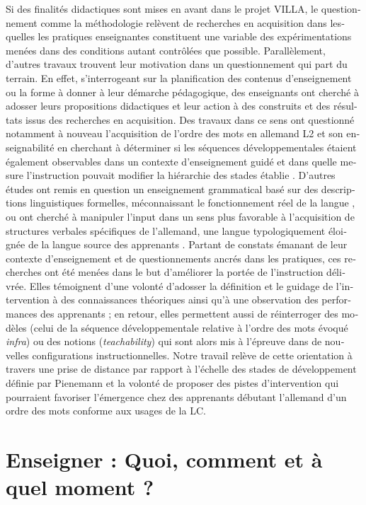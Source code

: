 \documentclass[output=paper]{langscibook}
\begin{document}
\begin{otherlanguage}{french}
Si des finalités didactiques sont mises en avant dans le projet VILLA, le questionnement comme la méthodologie relèvent de recherches en acquisition dans lesquelles les pratiques enseignantes constituent une variable des expérimentations menées dans des conditions autant contrôlées que possible. Parallèlement, d’autres travaux trouvent leur motivation dans un questionnement qui part du terrain. En effet, s’interrogeant sur la planification des contenus d’enseignement ou la forme à donner à leur démarche pédagogique, des enseignants ont cherché à adosser leurs propositions didactiques et leur action à des construits et des résultats issus des recherches en acquisition. Des travaux dans ce sens ont questionné notamment à nouveau l’acquisition de l’ordre des mots en allemand L2 et son enseignabilité en cherchant à déterminer si les séquences développementales étaient également observables dans un contexte d’enseignement guidé et dans quelle mesure l’instruction pouvait modifier la hiérarchie des stades établie \citep{DiehlEtAl2000}. D’autres études ont remis en question un enseignement grammatical basé sur des descriptions linguistiques formelles, méconnaissant le fonctionnement réel de la langue \citep{Felce2020}, ou ont cherché à manipuler l’input dans un sens plus favorable à l’acquisition de structures verbales spécifiques de l’allemand, une langue typologiquement éloignée de la langue source des apprenants \citep{Winkler2017}. Partant de constats émanant de leur contexte d’enseignement et de questionnements ancrés dans les pratiques, ces recherches ont été menées dans le but d’améliorer la portée de l’instruction délivrée. Elles témoignent d’une volonté d’adosser la définition et le guidage de l’intervention à des connaissances théoriques ainsi qu’à une observation des performances des apprenants ; en retour, elles permettent aussi de réinterroger des modèles (celui de la séquence développementale relative à l’ordre des mots évoqué \textit{infra}) ou des notions (\textit{teachability}) qui sont alors mis à l’épreuve dans de nouvelles configurations instructionnelles. Notre travail relève de cette orientation à travers une prise de distance par rapport à l’échelle des stades de développement définie par Pienemann et la volonté de proposer des pistes d’intervention qui pourraient favoriser l’émergence chez des apprenants débutant l’allemand d’un ordre des mots conforme aux usages de la LC.

\section{Enseigner : Quoi, comment et à quel moment ?}\label{sec:felce:4}


\end{otherlanguage}
\end{document}

